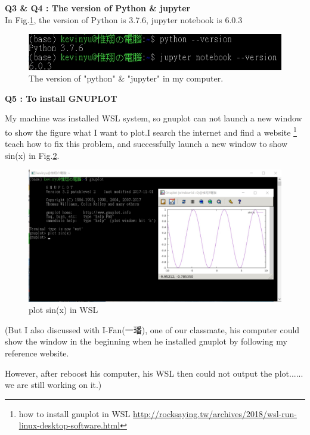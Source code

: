 \documentclass{article}
\begin{document}
\textbf{Q3 \& Q4 : The version of Python \& jupyter}\\

In Fig.\ref{Python}, the version of Python is 3.7.6, jupyter notebook is 6.0.3\\

\begin{figure}[h]
    \centering 
	\includegraphics[scale=0.65]{python jyupter.jpg}
	\caption{The version of "python" \& "jupyter" in my computer.}
	\label{Python}
\end{figure}
\textbf{Q5 : To install GNUPLOT \\}

My machine was installed WSL system, so gnuplot can not launch a new window to show the figure what I want to plot.I search the internet and find a website
\footnote{how to install gnuplot in WSL
\href{http://rocksaying.tw/archives/2018/wsl-run-linux-desktop-software.html}{http://rocksaying.tw/archives/2018/wsl-run-linux-desktop-software.html}}
teach how to fix this problem, and successfully launch a new window to show sin(x) in Fig.\ref{gnuplot}. 

\begin{figure}[h]
    \centering 
	\includegraphics[scale=0.4]{gnuplot.jpg}
	\caption{plot sin(x) in WSL}
	\label{gnuplot}
\end{figure}

\begin{CJK}{UTF8}{bsmi}
(But I also discussed with I-Fan(一璠), one of our classmate, his computer could show the window in the beginning when he installed gnuplot by following my reference website.
\end{CJK}
However, after reboost his computer, his WSL then could not output the plot...... we are still working on it.)
\end{document}
